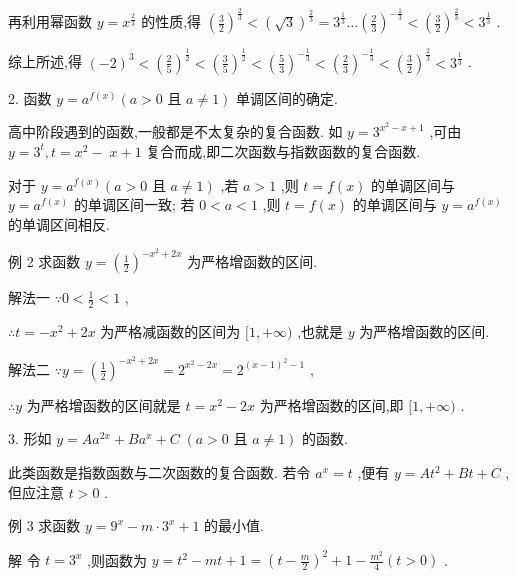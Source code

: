 \documentclass[10pt]{article}
\begin{document}
再利用幂函数 \(y = {x}^{\frac{2}{3}}\) 的性质,得 \({\left( \frac{3}{2}\right) }^{\frac{2}{3}} < {\left( \sqrt{3}\right) }^{\frac{2}{3}} = {3}^{\frac{1}{3}}\ldots {\left( \frac{2}{3}\right) }^{-\frac{1}{3}} < {\left( \frac{3}{2}\right) }^{\frac{2}{3}} < {3}^{\frac{1}{3}}\) .

综上所述,得 \({\left( -2\right) }^{3} < {\left( \frac{2}{5}\right) }^{\frac{1}{2}} < {\left( \frac{3}{5}\right) }^{\frac{1}{2}} < {\left( \frac{5}{3}\right) }^{-\frac{1}{3}} < {\left( \frac{2}{3}\right) }^{-\frac{1}{3}} < {\left( \frac{3}{2}\right) }^{\frac{2}{3}} < {3}^{\frac{1}{3}}\) .

2. 函数 \(y = {a}^{f\left( x\right) }\left( {a > 0\text{ 且 }a \neq  1}\right)\) 单调区间的确定.

高中阶段遇到的函数,一般都是不太复杂的复合函数. 如 \(y = {3}^{{x}^{2} - x + 1}\) ,可由 \(y = {3}^{t},t = {x}^{2} - \; x + 1\) 复合而成,即二次函数与指数函数的复合函数.

对于 \(y = {a}^{f\left( x\right) }\left( {a > 0\text{ 且 }a \neq  1}\right)\) ,若 \(a > 1\) ,则 \(t = f\left( x\right)\) 的单调区间与 \(y = {a}^{f\left( x\right) }\) 的单调区间一致; 若 \(0 < a < 1\) ,则 \(t = f\left( x\right)\) 的单调区间与 \(y = {a}^{f\left( x\right) }\) 的单调区间相反.

例 2 求函数 \(y = {\left( \frac{1}{2}\right) }^{-{x}^{2} + {2x}}\) 为严格增函数的区间.

解法一 \(\because 0 < \frac{1}{2} < 1\) ,

\(\therefore t =  - {x}^{2} + {2x}\) 为严格减函数的区间为 \(\lbrack 1, + \infty )\) ,也就是 \(y\) 为严格增函数的区间.

解法二 \(\because y = {\left( \frac{1}{2}\right) }^{-{x}^{2} + {2x}} = {2}^{{x}^{2} - {2x}} = {2}^{{\left( x - 1\right) }^{2} - 1}\) ,

\(\therefore y\) 为严格增函数的区间就是 \(t = {x}^{2} - {2x}\) 为严格增函数的区间,即 \(\lbrack 1, + \infty )\) .

3. 形如 \(y = A{a}^{2x} + B{a}^{x} + C\;\left( {a > 0\text{ 且 }a \neq  1}\right)\) 的函数.

此类函数是指数函数与二次函数的复合函数. 若令 \({a}^{x} = t\) ,便有 \(y = A{t}^{2} + {Bt} + C\) ,但应注意 \(t > 0\) .

例 3 求函数 \(y = {9}^{x} - m \cdot  {3}^{x} + 1\) 的最小值.

解 令 \(t = {3}^{x}\) ,则函数为 \(y = {t}^{2} - {mt} + 1 = {\left( t - \frac{m}{2}\right) }^{2} + 1 - \frac{{m}^{2}}{4}\left( {t > 0}\right)\) .
\end{document}

